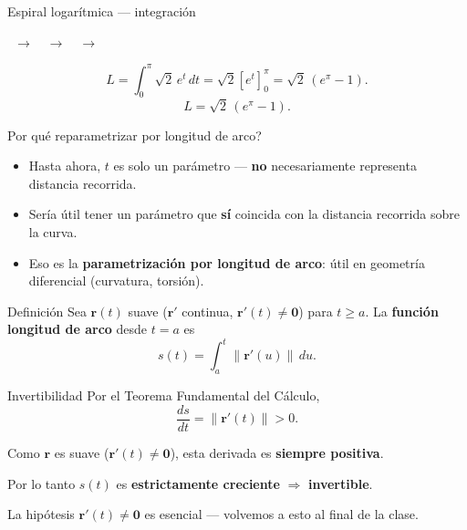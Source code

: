 \documentclass[11pt,aspectratio=169]{beamer}
\newcommand{\pasotracker}[1]{%
  {\footnotesize\centering
  \pasoitem{1}{1. Parametrización}{#1}\ $\rightarrow$\
  \pasoitem{2}{2. Derivada}{#1}\ $\rightarrow$\
  \pasoitem{3}{3. Magnitud}{#1}\ $\rightarrow$\
  \pasoitem{4}{4. Integración}{#1}\par}
  \vspace{4pt}
}
\begin{document}
\begin{frame}{Espiral logarítmica --- integración}
  \pasotracker{4}
  \[
    L=\int_0^\pi \sqrt2\,e^t\,dt = \sqrt2\left[e^t\right]_0^\pi = \sqrt2\,(e^\pi-1).
  \]
  \pause
  \[
    \boxed{L=\sqrt2\,(e^\pi-1).}
  \]
\end{frame}


\begin{frame}{\textquestiondown{}Por qué reparametrizar por longitud de arco?}
  \begin{itemize}
    \item Hasta ahora, $t$ es solo un parámetro --- \textbf{no} necesariamente representa distancia recorrida.
    \pause
    \item Sería útil tener un parámetro que \textbf{sí} coincida con la distancia recorrida sobre la curva.
    \pause
    \item Eso es la \textbf{parametrización por longitud de arco}: útil en geometría diferencial (curvatura, torsión).
  \end{itemize}
  \pause
  \begin{block}{Definición}
    Sea $\mathbf r(t)$ suave ($\mathbf r'$ continua, $\mathbf r'(t)\neq\mathbf 0$) para $t\ge a$. La \textbf{función longitud de arco} desde $t=a$ es
    \[
      s(t)=\int_a^t \|\mathbf r'(u)\|\,du.
    \]
  \end{block}
\end{frame}

\begin{frame}{Invertibilidad}
  Por el Teorema Fundamental del Cálculo,
  \[
    \frac{ds}{dt}=\|\mathbf r'(t)\| > 0.
  \]
  \pause
  \begin{center}\normalsize\color{tealx} Como $\mathbf r$ es suave ($\mathbf r'(t)\neq\mathbf 0$), esta derivada es \textbf{siempre positiva}.\end{center}
  \pause
  \vspace{6pt}
  Por lo tanto $s(t)$ es \textbf{estrictamente creciente} $\Rightarrow$ \textbf{invertible}.
  \vspace{6pt}
  \pause
  \begin{center}\small\color{gray60} La hipótesis $\mathbf r'(t)\neq\mathbf 0$ es esencial --- volvemos a esto al final de la clase.\end{center}
\end{frame}
\end{document}
